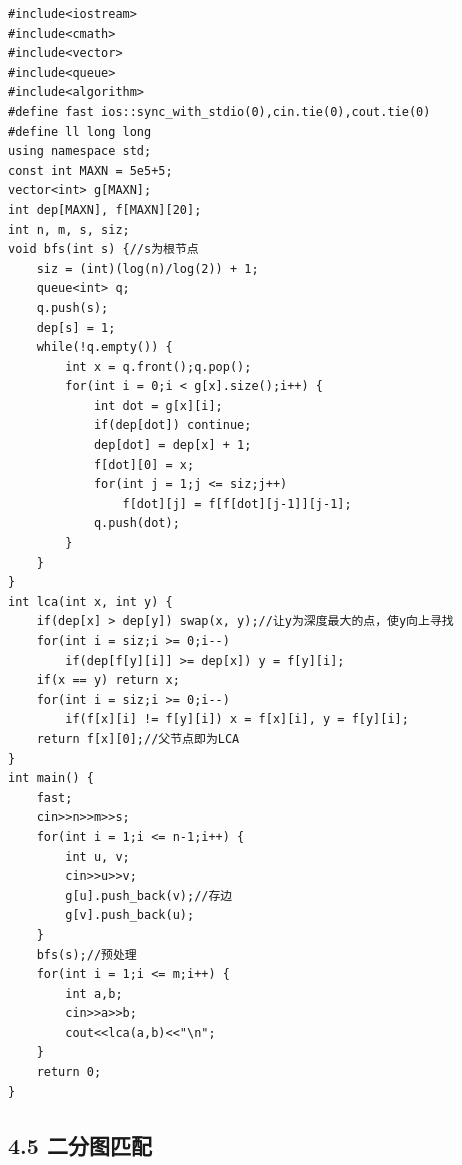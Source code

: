 \documentclass[11pt]{article}		%
\begin{document}
\begin{verbatim}
#include<iostream>
#include<cmath>
#include<vector>
#include<queue>
#include<algorithm>
#define fast ios::sync_with_stdio(0),cin.tie(0),cout.tie(0)
#define ll long long
using namespace std;
const int MAXN = 5e5+5;
vector<int> g[MAXN];
int dep[MAXN], f[MAXN][20];
int n, m, s, siz;
void bfs(int s) {//s为根节点
    siz = (int)(log(n)/log(2)) + 1;
    queue<int> q;
    q.push(s);
    dep[s] = 1;
    while(!q.empty()) {
        int x = q.front();q.pop();
        for(int i = 0;i < g[x].size();i++) {
            int dot = g[x][i];
            if(dep[dot]) continue;
            dep[dot] = dep[x] + 1;
            f[dot][0] = x;
            for(int j = 1;j <= siz;j++)
                f[dot][j] = f[f[dot][j-1]][j-1];
            q.push(dot);
        }
    }
}
int lca(int x, int y) {
    if(dep[x] > dep[y]) swap(x, y);//让y为深度最大的点，使y向上寻找
    for(int i = siz;i >= 0;i--)
        if(dep[f[y][i]] >= dep[x]) y = f[y][i];
    if(x == y) return x;
    for(int i = siz;i >= 0;i--) 
        if(f[x][i] != f[y][i]) x = f[x][i], y = f[y][i];
    return f[x][0];//父节点即为LCA
}
int main() {
    fast;
    cin>>n>>m>>s;
    for(int i = 1;i <= n-1;i++) {
        int u, v;
        cin>>u>>v;
        g[u].push_back(v);//存边
        g[v].push_back(u);
    }
    bfs(s);//预处理
    for(int i = 1;i <= m;i++) {
        int a,b;
        cin>>a>>b;
        cout<<lca(a,b)<<"\n";
    }
    return 0;
}
\end{verbatim}

\subsection{4.5 二分图匹配}\label{ux4e8cux5206ux56feux5339ux914d}
\end{document}
